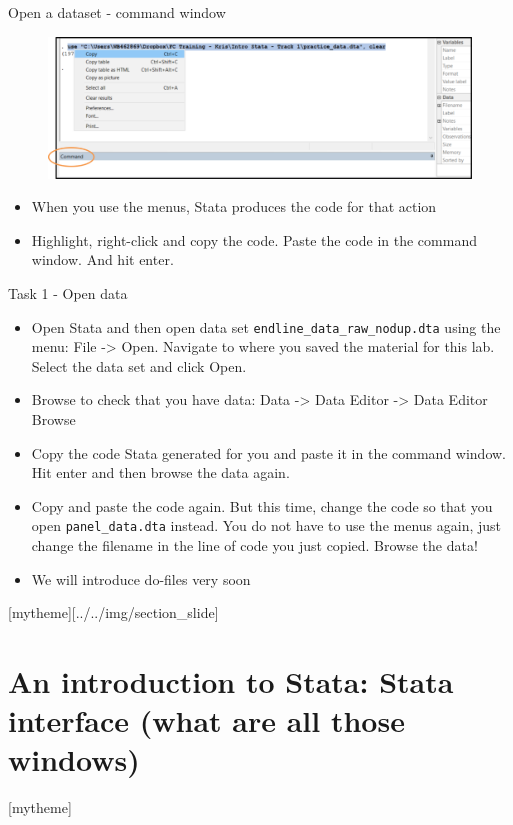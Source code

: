 \documentclass[aspectratio=169]{beamer}
\newcommand{\sectionpic}[2]{
	\setbeamertemplate{section page}[mytheme][#2]
	\section{#1}
	\setbeamertemplate{section page}[mytheme]
}
\begin{document}
\begin{frame}[fragile]{Open a dataset - command window}
	\begin{figure}
		\centering
		\includegraphics[width=\linewidth]{img/open_data_command}
	\end{figure}
	\begin{itemize}
		\item When you use the menus, Stata produces the code for that action
		\item Highlight, right-click and copy the code. Paste the code in the command window. And hit enter.
	\end{itemize}
\end{frame}

\begin{frame}{Task 1 - Open data}
	\begin{itemize}
		\item Open Stata and then open data set \texttt{endline\_data\_raw\_nodup.dta} using the menu: File -> Open. Navigate to where you saved the material for this lab. Select the data set and click Open.
		\item Browse to check that you have data: Data -> Data Editor -> Data Editor Browse
		\item Copy the code Stata generated for you and paste it in the command window. Hit enter and then browse the data again.
		\item Copy and paste the code again. But this time, change the code so that you open \texttt{panel\_data.dta} instead. You do not have to use the menus again, just change the filename in the line of code you just copied. Browse the data!
		\item We will introduce do-files very soon
	\end{itemize}
\end{frame}


\sectionpic{An introduction to Stata: Stata interface (what are all those windows)}{../../img/section_slide}
\end{document}
